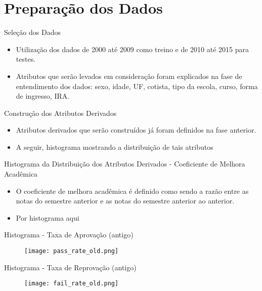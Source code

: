 
\section{Preparação dos Dados}
\begin{frame}{Seleção dos Dados}
\begin{itemize}[itemsep=3ex]
    \item Utilização dos dados de 2000 até 2009 como treino e de 2010 até 2015 para
        testes. 
    \item Atributos que serão levados em consideração foram explicados na fase de
        entendimento dos dados: sexo, idade, UF, cotista, tipo da escola,
        curso, forma de ingresso, IRA.
\end{itemize}
\end{frame}

\begin{frame}{Construção dos Atributos Derivados}
\begin{itemize}[itemsep=3ex]
    \item Atributos derivados que serão construídos já foram definidos na fase
        anterior.
    \item A seguir, histograma mostrando a distribuição de tais atributos
\end{itemize}
\end{frame}

\begin{frame}{Histograma da Distribuição dos Atributos Derivados - Coeficiente de
    Melhora Acadêmica}
\begin{itemize}[itemsep=3ex]
        \item O coeficiente de melhora acadêmica é definido como sendo a razão entre
            as notas do semestre anterior e as notas do semestre anterior ao
            anterior.
        \item Por histograma aqui
\end{itemize}
\end{frame}

\begin{frame}{Histograma - Taxa de Aprovação (antigo)}
    \begin{figure}[!ht]
    \centering
    \texttt{[image: pass\_rate\_old.png]}
    \end{figure}
\end{frame}

\begin{frame}{Histograma - Taxa de Reprovação (antigo)}
    \begin{figure}[!ht]
    \centering
    \texttt{[image: fail\_rate\_old.png]}
    \end{figure}
\end{frame}

